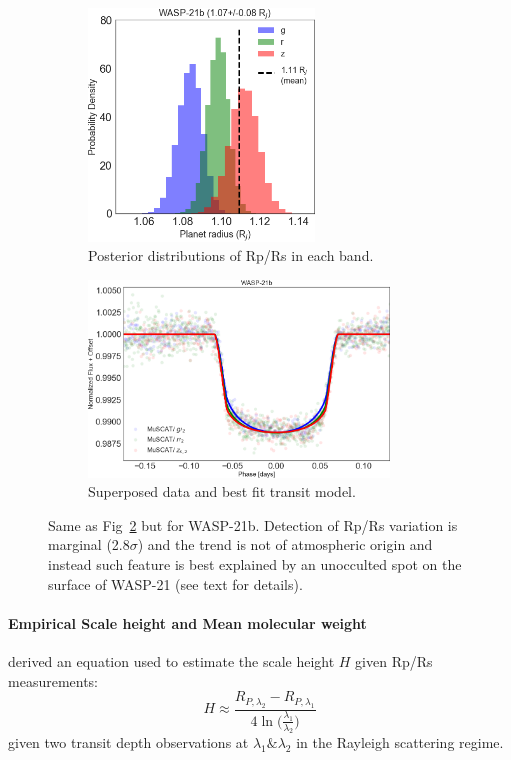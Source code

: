 \begin{figure}
\centering
\begin{subfigure}{.5\textwidth}
	\includegraphics[width=6cm]{wasp21/radius_ratios_Rjup.png}
    \caption{Posterior distributions of Rp/Rs in each band.}
\end{subfigure}%
\begin{subfigure}{.5\textwidth}
	\includegraphics[width=8cm]{wasp21/grz_multi_stacked.png}
    \caption{Superposed data and best fit transit model.}
    \label{fig:wasp21_stacked}
\end{subfigure}
\caption{Same as Fig~\ref{fig:wasp21_RpRs} but for WASP-21b. Detection of Rp/Rs variation is marginal (2.8$\sigma$) and the trend is not of atmospheric origin and instead such feature is best explained by an unocculted spot on the surface of WASP-21 (see text for details).}
\label{fig:wasp21_RpRs}
\end{figure}

\paragraph{Empirical Scale height and Mean molecular weight}
\cite{Benneke2012} derived an equation used to estimate the scale height $H$ given Rp/Rs measurements:
\begin{equation}
\label{eq:H_emp}
H \approx \frac{R_{P,\lambda_2}-R_{P,\lambda_1}}{4 \ln \Big(\frac{\lambda_1}{\lambda_2}\Big)}
\end{equation}
given two transit depth observations at $\lambda_1 \& \lambda_2$ in the Rayleigh scattering regime. 


